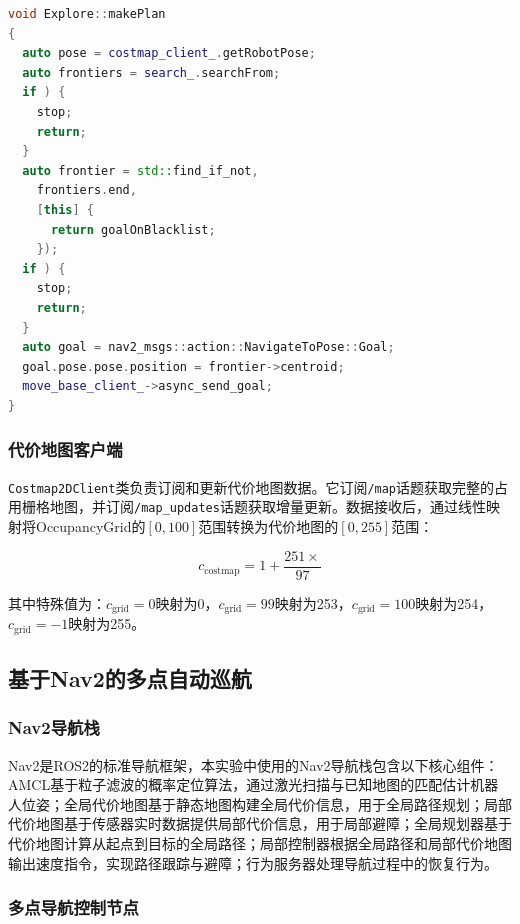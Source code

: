 \documentclass[a4paper,12pt]{article}
\begin{document}
\begin{lstlisting}[language=C++,title={探索主控逻辑}]
void Explore::makePlan
{
  auto pose = costmap_client_.getRobotPose;
  auto frontiers = search_.searchFrom;
  if ) {
    stop;
    return;
  }
  auto frontier = std::find_if_not,
    frontiers.end,
    [this] {
      return goalOnBlacklist;
    });
  if ) {
    stop;
    return;
  }
  auto goal = nav2_msgs::action::NavigateToPose::Goal;
  goal.pose.pose.position = frontier->centroid;
  move_base_client_->async_send_goal;
}
\end{lstlisting}

\subsubsection{代价地图客户端}

\texttt{Costmap2DClient}类负责订阅和更新代价地图数据。它订阅\texttt{/map}话题获取完整的占用栅格地图，并订阅\texttt{/map\_updates}话题获取增量更新。数据接收后，通过线性映射将OccupancyGrid的$[0, 100]$范围转换为代价地图的$[0, 255]$范围：

\begin{equation}
  c_{\text{costmap}} = 1 + \frac{251 \times }{97}
  \label{eq:costmap_translation}
\end{equation}

其中特殊值为：$c_{\text{grid}} = 0$映射为0，$c_{\text{grid}} = 99$映射为253，$c_{\text{grid}} = 100$映射为254，$c_{\text{grid}} = -1$映射为255。

\subsection{基于Nav2的多点自动巡航}

\subsubsection{Nav2导航栈}

Nav2是ROS2的标准导航框架，本实验中使用的Nav2导航栈包含以下核心组件：AMCL基于粒子滤波的概率定位算法，通过激光扫描与已知地图的匹配估计机器人位姿；全局代价地图基于静态地图构建全局代价信息，用于全局路径规划；局部代价地图基于传感器实时数据提供局部代价信息，用于局部避障；全局规划器基于代价地图计算从起点到目标的全局路径；局部控制器根据全局路径和局部代价地图输出速度指令，实现路径跟踪与避障；行为服务器处理导航过程中的恢复行为。

\subsubsection{多点导航控制节点}
\end{document}
